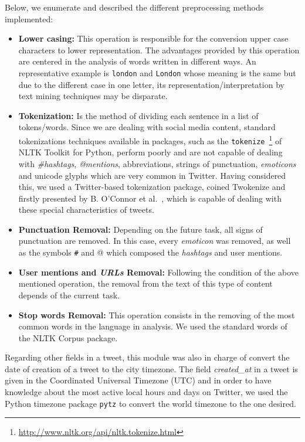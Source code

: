Below, we enumerate and described the different preprocessing methods implemented:

\begin{itemize}
	\item \textbf{Lower casing:} This operation is responsible for the conversion upper case characters to lower representation. The advantages provided by this operation are centered in the analysis of words written in different ways. An representative example is \texttt{london} and \texttt{London} whose meaning is the same but due to the different case in one letter, its representation/interpretation by text mining techniques may be disparate.
	\item \textbf{Tokenization:} Is the method of dividing each sentence in a list of tokens/words. Since we are dealing with social media content, standard tokenizations techniques available in packages, such as the \texttt{tokenize}~\footnote{\url{http://www.nltk.org/api/nltk.tokenize.html}} of NLTK Toolkit for Python, perform poorly and are not capable of dealing with \textit{\#hashtags}, \textit{@mentions}, abbreviations, strings of punctuation, \textit{emoticons} and unicode glyphs which are very common in Twitter. Having considered this, we used a Twitter-based tokenization package, coined Twokenize and firstly presented by B. O'Connor et al.~\cite{o2010tweetmotif}, which is capable of dealing with these special characteristics of tweets.
	\item \textbf{Punctuation Removal:} Depending on the future task, all signs of punctuation are removed. In this case, every \textit{emoticon} was removed, as well as the symbols \texttt{\#} and {@} which composed the \textit{hashtags} and user mentions.
	\item \textbf{User mentions and \textit{URLs} Removal:} Following the condition of the above mentioned operation, the removal from the text of this type of content depends of the current task.
	\item \textbf{Stop words Removal:} This operation consists in the removing of the most common words in the language in analysis. We used the standard words of the NLTK Corpus package.
\end{itemize}

Regarding other fields in a tweet, this module was also in charge of convert the date of creation of a tweet to the city timezone. The field \textit{created\_at} in a tweet is given in the Coordinated Universal Timezone (UTC) and in order to have knowledge about the most active local hours and days on Twitter, we used the Python timezone package \texttt{pytz} to convert the world timezone to the one desired.

